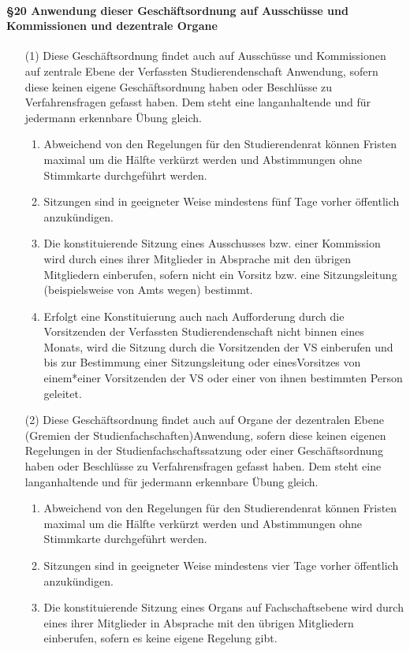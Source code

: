         \paragraph{§20 Anwendung dieser Geschäftsordnung auf Ausschüsse und Kommissionen und dezentrale Organe}
            \begin{itemize}
                \item[(1)] Diese Geschäftsordnung findet auch auf Ausschüsse und Kommissionen auf zentrale Ebene der Verfassten Studierendenschaft Anwendung, sofern diese keinen eigene Geschäftsordnung haben oder Beschlüsse zu Verfahrensfragen gefasst haben. Dem steht eine langanhaltende und für jedermann erkennbare Übung gleich.
                    \begin{enumerate}
                        \item Abweichend von den Regelungen für den Studierendenrat können Fristen maximal um die Hälfte verkürzt werden und Abstimmungen ohne Stimmkarte durchgeführt werden. 
                        \item Sitzungen sind in geeigneter Weise mindestens fünf Tage vorher öffentlich anzukündigen.
                        \item Die konstituierende Sitzung eines Ausschusses bzw. einer Kommission wird durch eines ihrer Mitglieder in Absprache mit den übrigen Mitgliedern einberufen, sofern nicht ein Vorsitz bzw. eine Sitzungsleitung (beispielsweise von Amts wegen) bestimmt.
                        \item Erfolgt eine Konstituierung auch nach Aufforderung durch die Vorsitzenden der Verfassten Studierendenschaft nicht binnen eines Monats, wird die Sitzung durch die Vorsitzenden der VS einberufen und bis zur Bestimmung einer Sitzungsleitung oder einesVorsitzes von einem*einer Vorsitzenden der VS oder einer von ihnen bestimmten Person geleitet. 
                    \end{enumerate}
                \item[(2)] Diese Geschäftsordnung findet auch auf Organe der dezentralen Ebene (Gremien der Studienfachschaften)Anwendung, sofern diese keinen eigenen Regelungen in der Studienfachschaftssatzung oder einer Geschäftsordnung haben oder Beschlüsse zu Verfahrensfragen gefasst haben. Dem steht eine langanhaltende und für jedermann erkennbare Übung gleich.
                    \begin{enumerate}
                        \item Abweichend von den Regelungen für den Studierendenrat können Fristen maximal um die Hälfte verkürzt werden und Abstimmungen ohne Stimmkarte durchgeführt werden. 
                        \item Sitzungen sind in geeigneter Weise mindestens vier Tage vorher öffentlich anzukündigen. 
                        \item Die konstituierende Sitzung eines Organs auf Fachschaftsebene wird durch eines ihrer Mitglieder in Absprache mit den übrigen Mitgliedern einberufen, sofern es keine eigene Regelung gibt.
                    \end{enumerate}
            \end{itemize}
